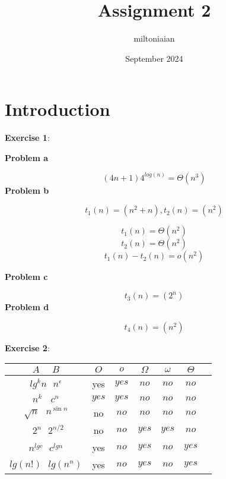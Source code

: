 \documentclass{article}
\title{Assignment 2}
\author{miltoniaian }
\date{September 2024}
\begin{document}
\maketitle

\section{Introduction}


\textbf{Exercise 1}:

\noindent\textbf{Problem a} 


\[
 (4n  + 1)  4^{log (n)}= \Theta(n^3)
\]
\noindent\textbf{Problem b} 

\[
  t_1 (n) = (n^2+ n) ,  t_2 (n) = (n^2)
\]

\[
  t_1 (n) = \Theta (n ^{2} )
\]
\[
  t_2 (n) = \Theta (n ^{2} )
\]
\[
 t_1 (n) - t_2 (n) = o(n^2)
\]

\noindent\textbf{Problem c} 


\[
  t_3(n) = (2^{n})
\]
\noindent\textbf{Problem d} 

\[
  t_4(n) = (n^2)
\]



\textbf{Exercise 2}:

\medskip

\begin{tabular}{|c|c|c|c|c|c|c|}
\hline
$ A \: \: \: \: \:  \: B $ & $O$ & $o$ & $\Omega$ & $\omega$ & $\Theta$ \\
\hline
$lg^k n \: \: \: n^\epsilon$ & yes & $ yes$  & $no$ & $no$ & $no$\\

$n^k \: \: \: \: c^n$ & $yes$ & $yes$ & $no$ & $no$ & $no$ \\

$\sqrt{n} \: \: \: n^{\sin n}$ & no & $ no$  & $no$ & $no$ & $no$\\
\
$2^n  \: \: \: 2^{n/2}$ & no & $ no$  & $yes$ & $yes$ & $no$\\

$n^{lg c} \: \: \: c ^{lg n}$ & yes & $ no$  & $yes$ & $no$ & $yes$\\

$lg (n!) \: \: \: lg(n^n)$ & yes & $ no$  & $yes$ & $no$ & $yes$\\

\hline
\end{tabular}
\medskip
\end{document}
